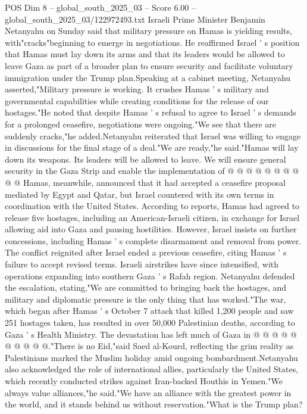 \begin{textsample}{POS Dim 8 – global\_south\_2025\_03 – Score 6.00 – global\_south\_2025\_03/122972493.txt}  \label{ex:f8_pos_141}
Israeli Prime Minister Benjamin Netanyahu on Sunday said that military pressure on Hamas is yielding results, with"cracks"beginning to emerge in negotiations.
He reaffirmed Israel ' s position that Hamas must lay down its arms and that its leaders would be allowed to leave Gaza as part of a broader plan to ensure security and facilitate voluntary immigration under the Trump plan.Speaking at a cabinet meeting, Netanyahu asserted,"Military pressure is working.
It crushes Hamas ' s military and governmental capabilities while creating conditions for the release of our hostages."He noted that despite Hamas ' s refusal to agree to Israel ' s demands for a prolonged ceasefire, negotiations were ongoing."We see that there are suddenly cracks,"he added.Netanyahu reiterated that Israel was willing to engage in discussions for the final stage of a deal."We are ready,"he said."Hamas will lay down its weapons.
Its leaders will be allowed to leave.
We will ensure general security in the Gaza Strip and enable the implementation of @ @ @ @ @ @ @ @ @ @ Hamas, meanwhile, announced that it had accepted a ceasefire proposal mediated by Egypt and Qatar, but Israel countered with its own terms in coordination with the United States.
According to reports, Hamas had agreed to release five hostages, including an American-Israeli citizen, in exchange for Israel allowing aid into Gaza and pausing hostilities.
However, Israel insists on further concessions, including Hamas ' s complete disarmament and removal from power.
The conflict reignited after Israel ended a previous ceasefire, citing Hamas ' s failure to accept revised terms.
Israeli airstrikes have since intensified, with operations expanding into southern Gaza ' s Rafah region.
Netanyahu defended the escalation, stating,"We are committed to bringing back the hostages, and military and diplomatic pressure is the only thing that has worked."The war, which began after Hamas ' s October 7 attack that killed 1,200 people and saw 251 hostages taken, has resulted in over 50,000 Palestinian deaths, according to Gaza ' s Health Ministry.
The devastation has left much of Gaza in @ @ @ @ @ @ @ @ @ @."There is no Eid,"said Saed al-Kourd, reflecting the grim reality as Palestinians marked the Muslim holiday amid ongoing bombardment.Netanyahu also acknowledged the role of international allies, particularly the United States, which recently conducted strikes against Iran-backed Houthis in Yemen."We always value alliances,"he said."We have an alliance with the greatest power in the world, and it stands behind us without reservation."What is the Trump plan?

\end{textsample}
